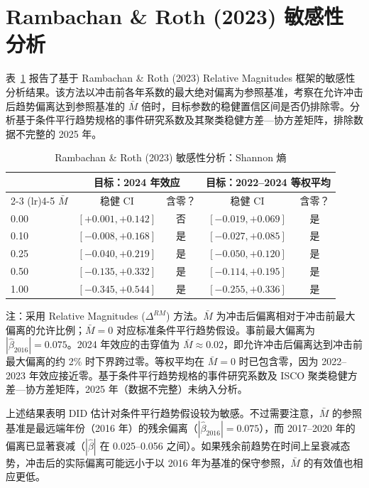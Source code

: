 \documentclass[12pt, a4paper]{article}
\begin{document}
\bigskip

\section{Rambachan \& Roth (2023) 敏感性分析}

表~\ref{tab:app_honestdid} 报告了基于 Rambachan \& Roth (2023) Relative Magnitudes 框架的敏感性分析结果。该方法以冲击前各年系数的最大绝对偏离为参照基准，考察在允许冲击后趋势偏离达到参照基准的 $\bar{M}$ 倍时，目标参数的稳健置信区间是否仍排除零。分析基于条件平行趋势规格的事件研究系数及其聚类稳健方差—协方差矩阵，排除数据不完整的 2025 年。

\begin{table}[htbp]
\centering
\caption{Rambachan \& Roth (2023) 敏感性分析：Shannon 熵}\label{tab:app_honestdid}
\begin{threeparttable}
\begin{tabular}{lcccc}
\toprule
& \multicolumn{2}{c}{目标：2024 年效应} & \multicolumn{2}{c}{目标：2022--2024 等权平均} \\
\cmidrule(lr){2-3} \cmidrule(lr){4-5}
$\bar{M}$ & 稳健 CI & 含零？ & 稳健 CI & 含零？ \\
\midrule
0.00 & $[+0.001, +0.142]$ & 否  & $[-0.019, +0.069]$ & 是 \\
0.10 & $[-0.008, +0.168]$ & 是  & $[-0.027, +0.085]$ & 是 \\
0.25 & $[-0.040, +0.219]$ & 是  & $[-0.050, +0.120]$ & 是 \\
0.50 & $[-0.135, +0.332]$ & 是  & $[-0.114, +0.195]$ & 是 \\
1.00 & $[-0.345, +0.544]$ & 是  & $[-0.255, +0.336]$ & 是 \\
\bottomrule
\end{tabular}
\begin{tablenotes}[flushleft]
\small
\item 注：采用 Relative Magnitudes ($\Delta^{RM}$) 方法。$\bar{M}$ 为冲击后偏离相对于冲击前最大偏离的允许比例；$\bar{M} = 0$ 对应标准条件平行趋势假设。事前最大偏离为 $|\hat{\beta}_{2016}| = 0.075$。2024 年效应的击穿值为 $\bar{M} \approx 0.02$，即允许冲击后偏离达到冲击前最大偏离的约 2\% 时下界跨过零。等权平均在 $\bar{M} = 0$ 时已包含零，因为 2022--2023 年效应接近零。基于条件平行趋势规格的事件研究系数及 ISCO 聚类稳健方差—协方差矩阵，2025 年（数据不完整）未纳入分析。
\end{tablenotes}
\end{threeparttable}
\end{table}

\noindent 上述结果表明 DID 估计对条件平行趋势假设较为敏感。不过需要注意，$\bar{M}$ 的参照基准是最远端年份（2016 年）的残余偏离（$|\hat{\beta}_{2016}| = 0.075$），而 2017--2020 年的偏离已显著衰减（$|\hat{\beta}|$ 在 0.025--0.056 之间）。如果残余前趋势在时间上呈衰减态势，冲击后的实际偏离可能远小于以 2016 年为基准的保守参照，$\bar{M}$ 的有效值也相应更低。
\end{document}
